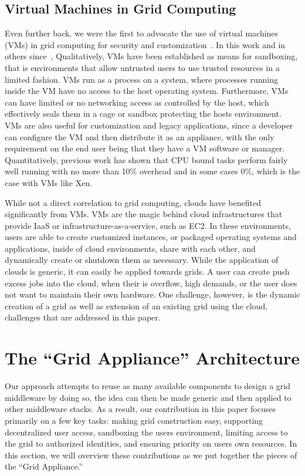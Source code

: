 \documentclass[conference]{IEEEtran}
\begin{document}
\subsection{Virtual Machines in Grid Computing}

Even further back, we were the first to advocate the use of virtual machines
(VMs) in grid computing for security and
customization~\cite{case_for_grid_computing_on_vms}.  In this work and in
others since~\cite{sandbox, swan, sandbox1}, Qualitatively, VMs have been
established as means for sandboxing, that is environments that allow untrusted
users to use trusted resources in a limited fashion.  VMs run as a process on a
system, where processes running inside the VM have no access to the host
operating system.  Furthermore, VMs can have limited or no networking access as
controlled by the host, which effectively seals them in a cage or sandbox
protecting the hosts environment.  VMs are also useful for customization and
legacy applications, since a developer can configure the VM and then distribute
it as an appliance, with the only requirement on the end user being that they
have a VM software or manager.  Quantitatively, previous work has shown that
CPU bound tasks perform fairly well running with no more than 10\% overhead and
in some cases 0\%, which is the case with VMs like Xen.

While not a direct correlation to grid computing, clouds have benefited
significantly from VMs.  VMs are the magic behind cloud infrastructures that
provide IaaS or infrastructure-as-a-service, such as EC2.  In these
environments, users are able to create customized instances, or packaged
operating systems and applications, inside of cloud environments, share with
each other, and dynamically create or shutdown them as necessary.  While the
application of clouds is generic, it can easily be applied towards grids.  A
user can create push excess jobs into the cloud, when their is overflow, high
demands, or the user does not want to maintain their own hardware.  One
challenge, however, is the dynamic creation of a grid as well as extension of
an existing grid using the cloud, challenges that are addressed in this paper.

\section{The ``Grid Appliance'' Architecture}
\label{architecture}

Our approach attempts to reuse as many available components to design a grid
middleware by doing so, the idea can then be made generic and then applied to
other middleware stacks.  As a result, our contribution in this paper focuses
primarily on a few key tasks:  making grid construction easy, supporting
decentralized user access, sandboxing the users environment, limiting access to
the grid to authorized identities, and ensuring priority on users own
resources.  In this section, we will overview these contributions as we put
together the pieces of the ``Grid Appliance.''
\end{document}
